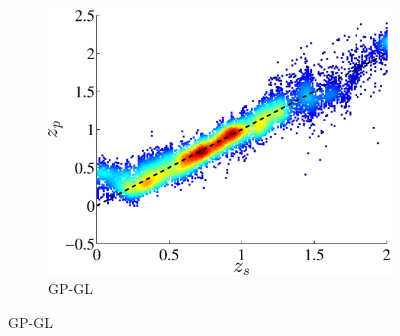 \documentclass[useAMS,usenatbib,fleqn]{mn2e}
\begin{document}
\begin{figure}
        \begin{subfigure}[b]{0.3\textwidth}
                \includegraphics[width=\textwidth]{figures/GPGL.eps}
                \caption{GP-GL}
                \label{GPGL-plot}
        \end{subfigure}
        

\end{figure}
\end{document}
